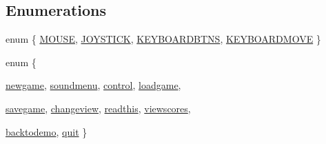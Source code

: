 \subsection*{Enumerations}
\begin{DoxyCompactItemize}
\item 
enum \{ \hyperlink{WL__MENU_8H_abed82baf7f470b522273a3e37c24c600a6abd13b0a6bf7894c7ceb5ff45ddbc14}{MOUSE}, 
\hyperlink{WL__MENU_8H_abed82baf7f470b522273a3e37c24c600a9cdb4c7b3f2d3cd904160e767d3a4a2c}{JOYSTICK}, 
\hyperlink{WL__MENU_8H_abed82baf7f470b522273a3e37c24c600a6a2b988f19e82c65655964b55ecf322e}{KEYBOARDBTNS}, 
\hyperlink{WL__MENU_8H_abed82baf7f470b522273a3e37c24c600ac6d3a13ad93e7cad6bf31e5c349fbb9d}{KEYBOARDMOVE}
 \}
\item 
enum \{ \par
\hyperlink{WL__MENU_8H_ab04a0655cd1e3bcac5e8f48c18df1a57abfd204677e264646f71160799d5ca0ce}{newgame}, 
\hyperlink{WL__MENU_8H_ab04a0655cd1e3bcac5e8f48c18df1a57afba6cb3ce82a267047b32e542ca61fab}{soundmenu}, 
\hyperlink{WL__MENU_8H_ab04a0655cd1e3bcac5e8f48c18df1a57a5d8add8effb2a9964dbebfd27c9ddd31}{control}, 
\hyperlink{WL__MENU_8H_ab04a0655cd1e3bcac5e8f48c18df1a57a128d476ac05e495b6339f4b2e068dc9f}{loadgame}, 
\par
\hyperlink{WL__MENU_8H_ab04a0655cd1e3bcac5e8f48c18df1a57a2b32c28cb822c23f53849ed6ec6e3197}{savegame}, 
\hyperlink{WL__MENU_8H_ab04a0655cd1e3bcac5e8f48c18df1a57ab35853708366be9a53171f82bfa817c5}{changeview}, 
\hyperlink{WL__MENU_8H_ab04a0655cd1e3bcac5e8f48c18df1a57a3f189de1562f1f36d754428334506c48}{readthis}, 
\hyperlink{WL__MENU_8H_ab04a0655cd1e3bcac5e8f48c18df1a57a960ceb630d8895150ed6a8453e5e9cee}{viewscores}, 
\par
\hyperlink{WL__MENU_8H_ab04a0655cd1e3bcac5e8f48c18df1a57a7ccf5bcc5ed10be3c03204184999932a}{backtodemo}, 
\hyperlink{WL__MENU_8H_ab04a0655cd1e3bcac5e8f48c18df1a57a3b81dce366295e52b47ca4d263ba8335}{quit}
 \}
\end{DoxyCompactItemize}
